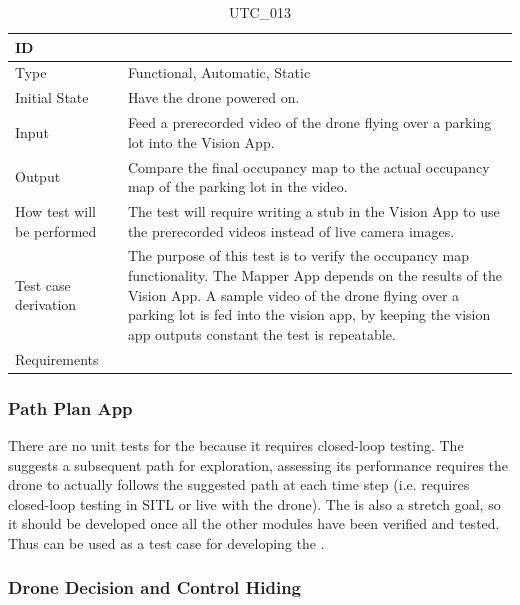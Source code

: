 \documentclass[12pt, titlepage]{article}
\begin{document}
\begin{table}[!h]
\begin{center}
\caption {UTC\_013}
\label{tab:UTC_013}
\begin{tabular}{ | m{3.2cm} | m{12.2cm} | } 
\hline
ID & \nameref{tab:UTC_013} \\ 
\hline
Type &  Functional, Automatic, Static  \\ 
\hline
Initial State & Have the drone powered on. \\ 
\hline
Input & Feed a prerecorded video of the drone flying over a parking lot into the Vision App.  \\ 
\hline
Output &  Compare the final occupancy map to the actual occupancy map of the parking lot in the video. \\ 
\hline
How test will be performed &  The test will require writing a stub in the Vision App to use the prerecorded videos instead of live camera images.\\ 
\hline
Test case derivation &  The purpose of this test is to verify the occupancy map functionality. The Mapper App depends on the results of the Vision App. A sample video of the drone flying over a parking lot is fed into the vision app, by keeping the vision app outputs constant the test is repeatable. \\ 
\hline
Requirements &  \\ 
\hline
\end{tabular}
\end{center}
\end{table}

\clearpage

\subsubsection{Path Plan App}
\label{PathPlanAppUnitTest}
There are no unit tests for the  because it requires closed-loop testing. The  suggests a subsequent path for exploration, assessing its performance requires the drone  to actually follows the suggested path at each time step (i.e. requires closed-loop testing in SITL or live with the drone). The  is also a stretch goal, so it should be developed once all the other modules have been verified and tested. Thus  can be used as a test case for developing the . 



\subsubsection{Drone Decision and Control Hiding}
\end{document}
